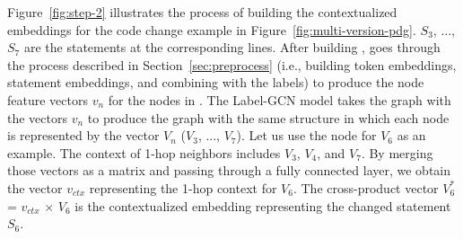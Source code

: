 
Figure~\ref{fig:step-2} illustrates the process of building the
contextualized embeddings for the code change example in
Figure~\ref{fig:multi-version-pdg}. $S_3$, ..., $S_7$ are the
statements at the corresponding lines. After building {\mvpdg},
{\tool} goes through the process described in
Section~\ref{sec:preprocess} (i.e., building token embeddings,
statement embeddings, and combining with the labels) to produce the
node feature vectors $v_n$ for the nodes in {\mvpdg}. The Label-GCN model
takes the graph with the vectors $v_n$ to produce the graph with the
same structure in which each node is represented by the vector $V_n$
($V_3$, ..., $V_7$). Let us use the node for $V_6$ as an example.  The
context of 1-hop neighbors includes $V_3$, $V_4$, and $V_7$. By
merging those vectors as a matrix and passing through a fully
connected layer, we obtain the vector $v_{ctx}$ representing the 1-hop
context for $V_6$. The cross-product vector  $V^{*}_6$ = $v_{ctx}$ $\times$ $V_6$
is the contextualized embedding representing the changed statement
$S_6$.





